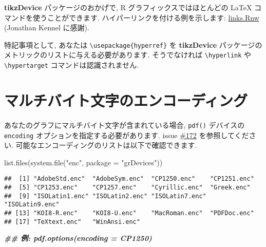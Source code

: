 \documentclass[
]{bxjsreport}
\newenvironment{Shaded}{\begin{snugshade}}{\end{snugshade}}
\newcommand{\AttributeTok}[1]{\textcolor[rgb]{0.77,0.63,0.00}{#1}}
\newcommand{\DocumentationTok}[1]{\textcolor[rgb]{0.56,0.35,0.01}{\textbf{\textit{#1}}}}
\newcommand{\FunctionTok}[1]{\textcolor[rgb]{0.00,0.00,0.00}{#1}}
\newcommand{\NormalTok}[1]{#1}
\newcommand{\StringTok}[1]{\textcolor[rgb]{0.31,0.60,0.02}{#1}}
\begin{document}
\textbf{tikzDevice} パッケージのおかげで, R グラフィックスではほとんどの
LaTeX コマンドを使うことができます. ハイパーリンクを付ける例を示します:
\href{https://gist.github.com/1937313}{links.Rnw} (Jonathan Kennel
に感謝).

特記事項として, あなたは \texttt{\textbackslash{}usepackage\{hyperref\}}
を \textbf{tikzDevice}
パッケージのメトリックのリストに与える必要があります. そうでなければ
\texttt{\textbackslash{}hyperlink} や
\texttt{\textbackslash{}hypertarget} コマンドは認識されません.

\hypertarget{ux30deux30ebux30c1ux30d0ux30a4ux30c8ux6587ux5b57ux306eux30a8ux30f3ux30b3ux30fcux30c7ux30a3ux30f3ux30b0}{%
\section*{マルチバイト文字のエンコーディング}\label{ux30deux30ebux30c1ux30d0ux30a4ux30c8ux6587ux5b57ux306eux30a8ux30f3ux30b3ux30fcux30c7ux30a3ux30f3ux30b0}}

あなたのグラフにマルチバイト文字が含まれている場合, \texttt{pdf()}
デバイスの \texttt{encoding} オプションを指定する必要があります. issue
\href{https://github.com/yihui/knitr/issues/172}{\#172}
を参照してください. 可能なエンコーディングのリストは以下で確認できます.

\begin{Shaded}
\begin{Highlighting}[numbers=left,,]
\FunctionTok{list.files}\NormalTok{(}\FunctionTok{system.file}\NormalTok{(}\StringTok{"enc"}\NormalTok{, }\AttributeTok{package =} \StringTok{"grDevices"}\NormalTok{))}
\end{Highlighting}
\end{Shaded}

\begin{verbatim}
##  [1] "AdobeStd.enc"  "AdobeSym.enc"  "CP1250.enc"    "CP1251.enc"   
##  [5] "CP1253.enc"    "CP1257.enc"    "Cyrillic.enc"  "Greek.enc"    
##  [9] "ISOLatin1.enc" "ISOLatin2.enc" "ISOLatin7.enc" "ISOLatin9.enc"
## [13] "KOI8-R.enc"    "KOI8-U.enc"    "MacRoman.enc"  "PDFDoc.enc"   
## [17] "TeXtext.enc"   "WinAnsi.enc"
\end{verbatim}

\begin{Shaded}
\begin{Highlighting}[numbers=left,,]
\DocumentationTok{\#\# 例: pdf.options(encoding = \textquotesingle{}CP1250\textquotesingle{})}
\end{Highlighting}
\end{Shaded}
\end{document}
